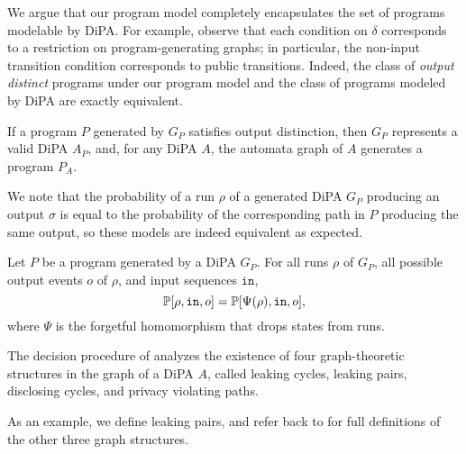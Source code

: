 We argue that our program model completely encapsulates the set of programs modelable by DiPA. 
For example, observe that each condition on $\delta$ corresponds to a restriction on program-generating graphs; in particular, the non-input transition condition corresponds to public transitions. 
Indeed, the class of \textit{output distinct} programs under our program model and the class of programs modeled by DiPA are exactly equivalent. 

\begin{prop}
    If a program $P$ generated by $G_P$ satisfies output distinction, then $G_P$ represents a valid DiPA $A_P$, and, for any DiPA $A$, the automata graph of $A$ generates a program $P_A$. 
\end{prop}

We note that the probability of a run $\rho$ of a generated DiPA $G_P$ producing an output $\sigma$ is equal to the probability of the corresponding path in $P$ producing the same output, so these models are indeed equivalent as expected.

\begin{prop}
    Let $P$ be a program generated by a DiPA $G_P$. For all runs $\rho$ of $G_P$, all possible output events $o$ of $\rho$, and input sequences $\texttt{in}$, \[
        \mathbb{P}[\rho, \texttt{in}, o]=\mathbb{P}[\Psi(\rho), \texttt{in}, o],
    \]
    where $\Psi$ is the forgetful homomorphism that drops states from runs. 
\end{prop}

The decision procedure of \cite{chadhaLinearTimeDecidability2021} analyzes the existence of four graph-theoretic structures in the graph of a DiPA $A$, called leaking cycles, leaking pairs, disclosing cycles, and privacy violating paths. 

As an example, we define leaking pairs, and refer back to \cite{chadhaLinearTimeDecidability2021} for full definitions of the other three graph structures.

